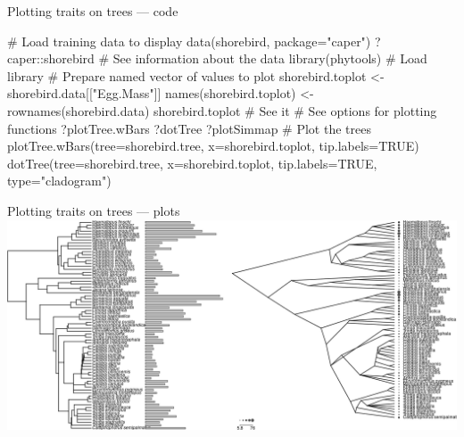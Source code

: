 \documentclass[compress, ucs, xelatex, 11pt, xcolor=svgnames,
  hyperref={
    bookmarks=true,
    unicode=true,
    colorlinks=true,
    pdftitle={Molecular data in R},
    plainpages=false,
    pdfauthor={Vojtech Zeisek},
    pdfsubject={Course about phylogeny and evolution in R},
    pdfcreator={XeLaTeX},
    pdfkeywords={R, evolution, phylogeny, molecular data},
    linkcolor=Tomato,
    anchorcolor=SaddleBrown,
    citecolor=Goldenrod,
    filecolor=DarkMagenta,
    menucolor=Sienna,
    urlcolor=DarkTurquoise,
    pdftex},
  url={hyphens, lowtilde} %
  ]{beamer}
\begin{document}
%

\begin{frame}[fragile]{Plotting traits on trees --- code}
  \begin{spluscode}
    # Load training data to display
    data(shorebird, package="caper")
    ?caper::shorebird # See information about the data
    library(phytools) # Load library
    # Prepare named vector of values to plot
    shorebird.toplot <- shorebird.data[["Egg.Mass"]]
    names(shorebird.toplot) <- rownames(shorebird.data)
    shorebird.toplot # See it
    # See options for plotting functions
    ?plotTree.wBars
    ?dotTree
    ?plotSimmap
    # Plot the trees
    plotTree.wBars(tree=shorebird.tree, x=shorebird.toplot,
      tip.labels=TRUE)
    dotTree(tree=shorebird.tree, x=shorebird.toplot, tip.labels=TRUE,
      type="cladogram")
  \end{spluscode}
\end{frame}

\begin{frame}{Plotting traits on trees --- plots}
  \includegraphics[width=\textwidth]{treeval.png}
\end{frame}

\section{}
\end{document}
